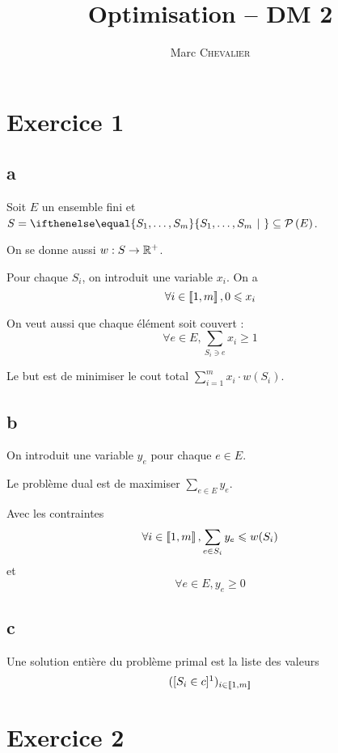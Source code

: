 

\title{Optimisation \--- DM 2}
\author{Marc \textsc{Chevalier}}
\date{}



\maketitle

\section*{Exercice 1}

\subsection*{a}

Soit $E$ un ensemble fini et $S=\set{S_1,\ldots,S_m}{}\subseteq \parties{E}$.

On se donne aussi $w:S\rightarrow \mathbb{R}^+$.

Pour chaque $S_i$, on introduit une variable $x_i$. On a 
\[
    \forall i \in \left\llbracket 1, m \right\rrbracket, 0\leqslant x_i
\]

On veut aussi que chaque élément soit couvert :
\[
    \forall e\in E, \sum\limits_{S_i \ni e} x_i \geqslant 1
\]

Le but est de minimiser le cout total $\sum\limits_{i=1}^m x_i \cdot w(S_i)$.

\subsection*{b}

On introduit une variable $y_e$ pour chaque $e\in E$.

Le problème dual est de maximiser $\sum\limits_{e \in E} y_e$.

Avec les contraintes
\[
    \forall i\in\left\llbracket 1, m \right\rrbracket, \sum\limits_{e\in S_i} y_e \leqslant w(S_i)
\]
et
\[
    \forall e\in E, y_e \geqslant 0
\]

\subsection*{c}

Une solution entière du problème primal est la liste des valeurs
\[
    ([S_i\in c]\footnotemark)_{i\in\entiers{1}{m}}
\]

\section*{Exercice 2}

